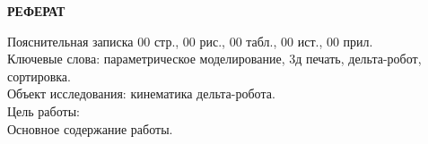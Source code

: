 \begin{center}
\large{\textbf{РЕФЕРАТ}}\\
\end{center}
Пояснительная записка 00 стр., 00 рис., 00 табл., 00 ист., 00 прил.\\
Ключевые слова: параметрическое моделирование, 3д печать, дельта-робот, сортировка.\\
Объект исследования:  кинематика дельта-робота.\\
Цель работы:\\
Основное содержание работы.


